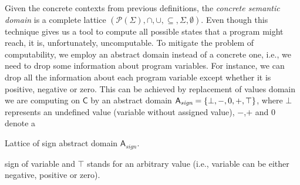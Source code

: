 Given the concrete contexts from previous definitions, the \emph{concrete
semantic domain} is a complete lattice $(\mathcal{P}(\Sigma), \cap, \cup,
\subseteq, \Sigma, \emptyset)$. Even though this technique gives us a tool to
compute all possible states that a program might reach, it is, unfortunately,
uncomputable. To mitigate the problem of computability, we employ an abstract
domain instead of a concrete one, i.e., we need to drop some information about
program variables. For instance, we can drop all the information about each program
variable except whether it is positive, negative or zero. This can be achieved
by replacement of values domain we are computing on $\mathsf{C}$ by an abstract
domain $\mathsf{A}_{\textit{sign}} = \{\bot, -, 0, +, \top\}$, where $\bot$ represents an
undefined value (variable without assigned value), $-$,$+$ and $0$ denote a
\begin{marginfigure}%
    \centering
    \caption{Lattice of sign abstract domain $\mathsf{A}_{\textit{sign}}$.}
    \label{fig:signd}%
\end{marginfigure}%
sign of variable and $\top$ stands for an arbitrary value (i.e., variable can be
either negative, positive or zero).

